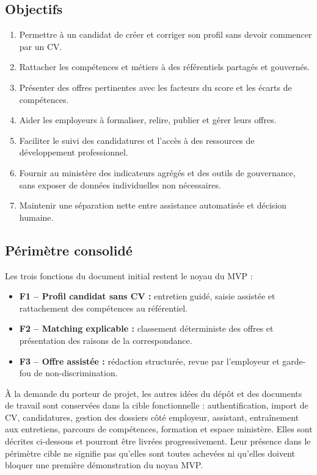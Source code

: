 \documentclass[11pt,a4paper]{article}
\begin{document}
\subsection{Objectifs}
\begin{enumerate}
  \item Permettre à un candidat de créer et corriger son profil sans devoir commencer par un CV.
  \item Rattacher les compétences et métiers à des référentiels partagés et gouvernés.
  \item Présenter des offres pertinentes avec les facteurs du score et les écarts de compétences.
  \item Aider les employeurs à formaliser, relire, publier et gérer leurs offres.
  \item Faciliter le suivi des candidatures et l'accès à des ressources de développement professionnel.
  \item Fournir au ministère des indicateurs agrégés et des outils de gouvernance, sans exposer de données individuelles non nécessaires.
  \item Maintenir une séparation nette entre assistance automatisée et décision humaine.
\end{enumerate}

\subsection{Périmètre consolidé}

Les trois fonctions du document initial restent le noyau du MVP :
\begin{itemize}
  \item \textbf{F1 -- Profil candidat sans CV :} entretien guidé, saisie assistée et rattachement des compétences au référentiel.
  \item \textbf{F2 -- Matching explicable :} classement déterministe des offres et présentation des raisons de la correspondance.
  \item \textbf{F3 -- Offre assistée :} rédaction structurée, revue par l'employeur et garde-fou de non-discrimination.
\end{itemize}

À la demande du porteur de projet, les autres idées du dépôt et des documents de travail sont conservées dans la cible fonctionnelle : authentification, import de CV, candidatures, gestion des dossiers côté employeur, assistant, entraînement aux entretiens, parcours de compétences, formation et espace ministère. Elles sont décrites ci-dessous et pourront être livrées progressivement. Leur présence dans le périmètre cible ne signifie pas qu'elles sont toutes achevées ni qu'elles doivent bloquer une première démonstration du noyau MVP.
\end{document}
